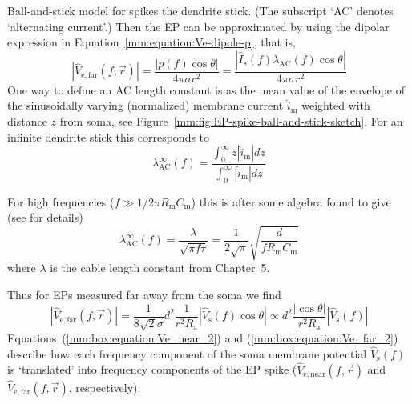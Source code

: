 \begin{boxfloat}{Ball-and-stick model for spikes}
the dendrite stick. (The subscript `AC' denotes `alternating current'.)
Then the EP can be approximated by using the 
dipolar expression in Equation~\ref{mm:equation:Ve-dipole-p}, that is,
\begin{equation}
  |\hat{V}_\mathrm{e,far}(f,\vec{r})| =  \frac{|p(f) \cos \theta|}{4 \pi \sigma r^2} 
                                            = \frac{| \hat{I}_{s}(f) \lambda_\mathrm{AC}(f) \cos \theta|}{4 \pi \sigma r^2}   
                                                                                        \label{mm:box:equation:Ve_far_1}
\end{equation}
One way to define an AC length constant is as the mean value of the 
envelope of the sinusoidally varying (normalized) membrane current
$\hat{i}_\mathrm{m}$ weighted with distance $z$ from soma, 
see Figure~\ref{mm:fig:EP-spike-ball-and-stick-sketch}. 
For an infinite dendrite stick this corresponds to
%
\begin{equation}
  \lambda_\mathrm{AC}^\infty(f) = \frac{\int_0^\infty z |\hat{i}_\mathrm{m}| dz}{\int_0^\infty |\hat{i}_\mathrm{m}| dz} 
\nonumber
\end{equation}
%

For high frequencies ($f \gg 1/2 \pi R_\mathrm{m} C_\mathrm{m}$) this is after some algebra 
found to give (see \citet[Appendix C]{Pettersen2008} for details)
%
\begin{equation}
 \lambda_\mathrm{AC}^\infty(f) =  \frac{\lambda}{\sqrt{\pi f \tau}} = 
  \frac{1}{2\sqrt{\pi}} \sqrt{\frac{d}{f R_\mathrm{m} C_\mathrm{m}}}
\label{mm:box:equation:approx_lambda_ac}
\end{equation}
%
where $\lambda$ is the cable length constant from 
Chapter~5.  

%
Thus for EPs measured far away from the soma we find 
%  
\begin{equation}
  |\hat{V}_\mathrm{e,far}(f,\vec{r})|  = \frac{1}{8 \sqrt{2} \sigma} d^{2} \frac{1}{r^2  R_\mathrm{a}} 
      |\hat{V}_\mathrm{s}(f) \cos \theta | 
  \propto d^{2} \frac{|\cos \theta|}{r^2  R_\mathrm{a}} |\hat{V}_\mathrm{s}(f)| 
  \label{mm:box:equation:Ve_far_2}
\end{equation}
%
Equations~(\ref{mm:box:equation:Ve_near_2}) and (\ref{mm:box:equation:Ve_far_2}) describe how each frequency component of 
the soma membrane potential  $\hat{V}_\mathrm{s}(f)$ is `translated' into frequency components of the 
EP spike ($\hat{V}_\mathrm{e,near}(f,\vec{r})$ and $\hat{V}_\mathrm{e,far}(f,\vec{r})$, respectively). 
\end{boxfloat}


